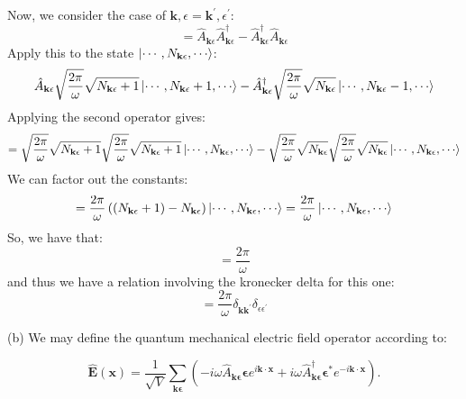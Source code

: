 \documentclass[12pt]{article}
\begin{document}
Now, we consider the case of $\mathbf{k},\epsilon = \mathbf{k^{\prime}},\epsilon^{\prime}$:
\begin{equation}
  [\hat{A}_{\mathbf{k} \epsilon},\hat{A}^\dagger_{\mathbf{k} \epsilon}] = \hat{A}_{\mathbf{k} \epsilon}\hat{A}^\dagger_{\mathbf{k} \epsilon} - \hat{A}^\dagger_{\mathbf{k} \epsilon}\hat{A}_{\mathbf{k} \epsilon}
\end{equation}
Apply this to the state $\ket{\cdots ,N_{\mathbf{k} \epsilon}, \cdots}$:
\begin{equation}
  \hat{A}_{\mathbf{k} \epsilon}\sqrt{\frac{2\pi}{\omega }} \sqrt{N_{\mathbf{k} \epsilon}+1}\ket{\cdots ,N_{\mathbf{k} \epsilon}+1, \cdots} - \hat{A}^\dagger_{\mathbf{k} \epsilon}\sqrt{\frac{2\pi}{\omega }} \sqrt{N_{\mathbf{k} \epsilon}}\ket{\cdots ,N_{\mathbf{k} \epsilon}-1, \cdots}
\end{equation}
Applying the second operator gives:
\begin{equation}
  =\sqrt{\frac{2\pi}{\omega }} \sqrt{N_{\mathbf{k} \epsilon}+1}\sqrt{\frac{2\pi}{\omega }} \sqrt{N_{\mathbf{k} \epsilon}+1}\ket{\cdots ,N_{\mathbf{k} \epsilon}, \cdots}  - \sqrt{\frac{2\pi}{\omega }} \sqrt{N_{\mathbf{k} \epsilon}}\sqrt{\frac{2\pi}{\omega }} \sqrt{N_{\mathbf{k} \epsilon}}\ket{\cdots ,N_{\mathbf{k} \epsilon}, \cdots}
\end{equation}
We can factor out the constants:
\begin{equation}
  = \frac{2\pi}{\omega } \left( \left( N_{\mathbf{k} \epsilon}+1\right) - N_{\mathbf{k} \epsilon}\right)\ket{\cdots ,N_{\mathbf{k} \epsilon}, \cdots} = \frac{2\pi}{\omega }\ket{\cdots ,N_{\mathbf{k} \epsilon}, \cdots}
\end{equation}
So, we have that:
\begin{equation}
  [\hat{A}_{\mathbf{k} \epsilon},\hat{A}^\dagger_{\mathbf{k} \epsilon}] = \frac{2\pi}{\omega }
\end{equation}
and thus we have a relation involving the kronecker delta for this one:
\begin{equation}
  [\hat{A}_{\mathbf{k} \epsilon},\hat{A}^\dagger_{\mathbf{k^{\prime}} \epsilon^{\prime}}] = \frac{2\pi}{\omega }\delta_{\mathbf{k}\mathbf{k^{\prime}}}\delta_{\epsilon\epsilon^{\prime}}
\end{equation}

(b) We may define the quantum mechanical electric field operator according to:


\begin{equation*}
\hat{\mathbf{E}}(\mathbf{x})=\frac{1}{\sqrt{V}} \sum_{\mathbf{k} \boldsymbol{\epsilon}}\left(-i \omega \hat{A}_{\mathbf{k} \boldsymbol{\epsilon}} \boldsymbol{\epsilon} e^{i \mathbf{k} \cdot \mathbf{x}}+i \omega \hat{A}_{\mathbf{k} \boldsymbol{\epsilon}}^{\dagger} \boldsymbol{\epsilon}^{*} e^{-i \mathbf{k} \cdot \mathbf{x}}\right) . \tag{7}
\end{equation*}
\end{document}
